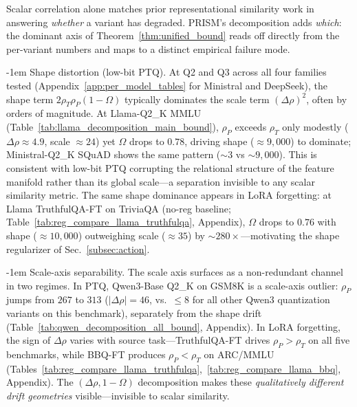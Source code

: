 \documentclass{article}
\makeatletter
\newlength{\paraSpace}
\renewcommand{\paragraph}{\@startsection{paragraph}{4}{\z@}%
  {\paraSpace}{-1em}%
  {\normalfont\normalsize\bfseries}}
\makeatother
\begin{document}
Scalar correlation alone matches prior representational similarity work in answering \emph{whether} a variant has degraded. PRISM's decomposition adds \emph{which}: the dominant axis of Theorem~\ref{thm:unified_bound} reads off directly from the per-variant numbers and maps to a distinct empirical failure mode.

\paragraph{Shape distortion (low-bit PTQ).}
At Q2 and Q3 across all four families tested (Appendix~\ref{app:per_model_tables} for Ministral and DeepSeek), the shape term $2\rho_T\rho_P(1{-}\Omega)$ typically dominates the scale term $(\Delta\rho)^2$, often by orders of magnitude. At Llama-Q2\_K MMLU (Table~\ref{tab:llama_decomposition_main_bound}), $\rho_P$ exceeds $\rho_T$ only modestly ($\Delta\rho \approx 4.9$, scale $\approx 24$) yet $\Omega$ drops to $0.78$, driving shape ($\approx 9{,}000$) to dominate; Ministral-Q2\_K SQuAD shows the same pattern ($\sim 3$ vs $\sim 9{,}000$). This is consistent with low-bit PTQ corrupting the relational structure of the feature manifold rather than its global scale---a separation invisible to any scalar similarity metric. The same shape dominance appears in LoRA forgetting: at Llama TruthfulQA-FT on TriviaQA (no-reg baseline; Table~\ref{tab:reg_compare_llama_truthfulqa}, Appendix), $\Omega$ drops to $0.76$ with shape ($\approx 10{,}000$) outweighing scale ($\approx 35$) by ${\sim}280\times$---motivating the shape regularizer of Sec.~\ref{subsec:action}.

\paragraph{Scale-axis separability.}
The scale axis surfaces as a non-redundant channel in two regimes. In PTQ, Qwen3-Base Q2\_K on GSM8K is a scale-axis outlier: $\rho_P$ jumps from $267$ to $313$ ($|\Delta\rho|{=}46$, vs.\ $\le 8$ for all other Qwen3 quantization variants on this benchmark), separately from the shape drift (Table~\ref{tab:qwen_decomposition_all_bound}, Appendix). In LoRA forgetting, the sign of $\Delta\rho$ varies with source task---TruthfulQA-FT drives $\rho_P > \rho_T$ on all five benchmarks, while BBQ-FT produces $\rho_P < \rho_T$ on ARC/MMLU (Tables~\ref{tab:reg_compare_llama_truthfulqa},~\ref{tab:reg_compare_llama_bbq}, Appendix). The $(\Delta\rho, 1{-}\Omega)$ decomposition makes these \emph{qualitatively different drift geometries} visible---invisible to scalar similarity.
\end{document}
